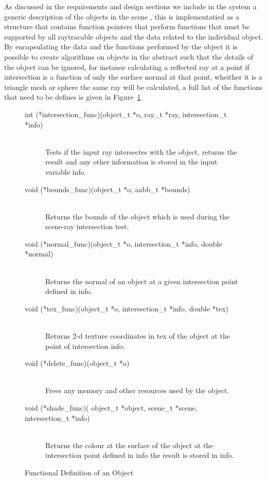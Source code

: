 As discussed in the requirements and design sections we include in the system a generic description of the objects in the
scene , this is implementatied as a structure that contains function pointers that perform functions
that must be supported by all raytracable objects and the data related to the individual object.
By encapsulating the data and the functions performed by the object it is possible to create algorithms on objects in the
abstract such that the details of the object can be ignored, for instance calculating a reflected ray at a point if intersection
is a function of only the surface normal at that point, wheither it is a triangle mesh or sphere the same ray will be calculated,
a full list of the functions that need to be defines is given in Figure~\ref{fig:object_funcs}

\begin{figure}[h]
\begin{description}
\item[int  (*intersection\_func)(object\_t *o, ray\_t *ray, intersection\_t *info)] \hfill \\
	Tests if the input ray intersectes with the object, returns the result and any other information is stored in the input variable info
\item[void (*bounds\_func)(object\_t *o, aabb\_t *bounds)] \hfill \\
	Returns the bounds of the object which is used during the scene-ray intersection test.
\item[void (*normal\_func)(object\_t *o, intersection\_t *info, double *normal)] \hfill \\
	Returns the normal of an object at a given intersection point defined in info.
\item[void (*tex\_func)(object\_t *o, intersection\_t *info, double *tex)] \hfill \\
	Returns 2-d texture coordinates in tex of the object at the point of intersection info.
\item[void (*delete\_func)(object\_t *o)] \hfill \\
	Frees any memory and other resources used by the object.
\item[void (*shade\_func)( object\_t *object, scene\_t *scene, intersection\_t *info)] \hfill \\
	Returns the colour at the surface of the object at the intersection point defined in info the result is stored in info.
\end{description}
\caption{Functional Definition of an Object}
\label{fig:object_funcs}
\end{figure}


